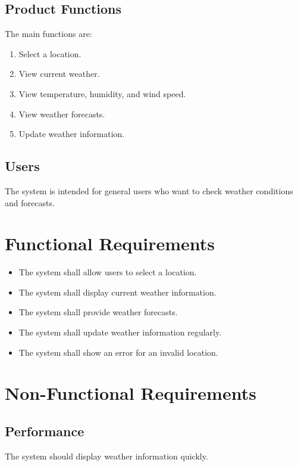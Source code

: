 \documentclass[12pt,a4paper]{article}
\begin{document}
\subsection{Product Functions}

The main functions are:

\begin{enumerate}
\item Select a location.
\item View current weather.
\item View temperature, humidity, and wind speed.
\item View weather forecasts.
\item Update weather information.
\end{enumerate}

\subsection{Users}

The system is intended for general users who want to check weather
conditions and forecasts.

\section{Functional Requirements}

\begin{itemize}
\item The system shall allow users to select a location.
\item The system shall display current weather information.
\item The system shall provide weather forecasts.
\item The system shall update weather information regularly.
\item The system shall show an error for an invalid location.
\end{itemize}

\section{Non-Functional Requirements}

\subsection{Performance}

The system should display weather information quickly.
\end{document}
